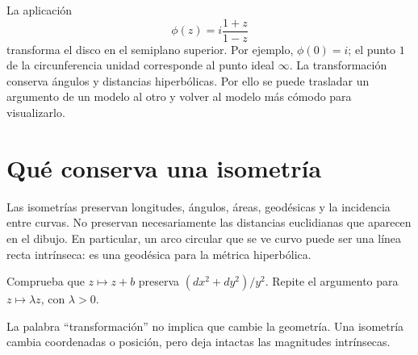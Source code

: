 La aplicación
\[
  \phi(z)=i\frac{1+z}{1-z}
\]
transforma el disco en el semiplano superior. Por ejemplo, \(\phi(0)=i\); el punto \(1\) de la circunferencia unidad corresponde al punto ideal \(\infty\). La transformación conserva ángulos y distancias hiperbólicas. Por ello se puede trasladar un argumento de un modelo al otro y volver al modelo más cómodo para visualizarlo.

\section{Qué conserva una isometría}

Las isometrías preservan longitudes, ángulos, áreas, geodésicas y la incidencia entre curvas. No preservan necesariamente las distancias euclidianas que aparecen en el dibujo. En particular, un arco circular que se ve curvo puede ser una línea recta intrínseca: es una geodésica para la métrica hiperbólica.

\begin{exercise}
Comprueba que \(z\mapsto z+b\) preserva \((dx^2+dy^2)/y^2\). Repite el argumento para \(z\mapsto\lambda z\), con \(\lambda>0\).
\end{exercise}

\begin{remark}
La palabra “transformación” no implica que cambie la geometría. Una isometría cambia coordenadas o posición, pero deja intactas las magnitudes intrínsecas.
\end{remark}
